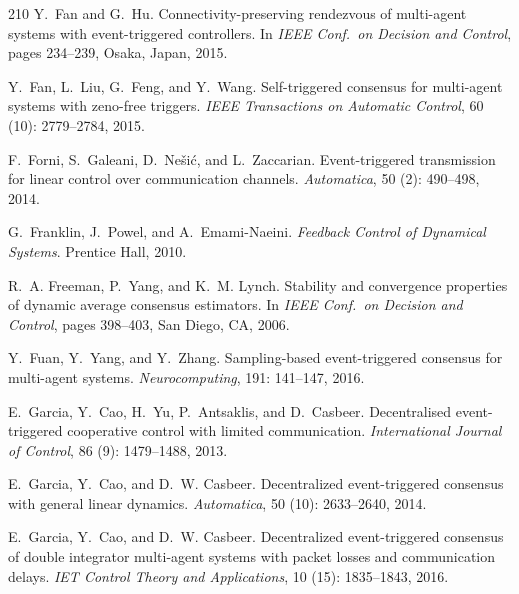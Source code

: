 \documentclass{autart}
\begin{document}
{\begin{thebibliography}{210}
Y.~Fan and G.~Hu.
\newblock Connectivity-preserving rendezvous of multi-agent systems with
  event-triggered controllers.
\newblock In \emph{{IEEE} Conf.\ on Decision and Control}, pages 234--239,
  Osaka, Japan, 2015.

Y.~Fan, L.~Liu, G.~Feng, and Y.~Wang.
\newblock Self-triggered consensus for multi-agent systems with zeno-free
  triggers.
\newblock \emph{IEEE Transactions on Automatic Control}, 60
  (10): 2779--2784, 2015.

F.~Forni, S.~Galeani, D.~Ne{\v{s}}i{\'c}, and L.~Zaccarian.
\newblock Event-triggered transmission for linear control over communication
  channels.
\newblock \emph{Automatica}, 50 (2): 490--498, 2014.

G.~Franklin, J.~Powel, and A.~Emami-Naeini.
\newblock \emph{Feedback Control of Dynamical Systems}.
\newblock Prentice Hall, 2010.

R.~A. Freeman, P.~Yang, and K.~M. Lynch.
\newblock Stability and convergence properties of dynamic average consensus
  estimators.
\newblock In \emph{{IEEE} Conf.\ on Decision and Control}, pages 398--403, San
  Diego, CA, 2006.

Y.~Fuan, Y.~Yang, and Y.~Zhang.
\newblock Sampling-based event-triggered consensus for multi-agent systems.
\newblock \emph{Neurocomputing}, 191: 141--147, 2016.

E.~Garcia, Y.~Cao, H.~Yu, P.~Antsaklis, and D.~Casbeer.
\newblock Decentralised event-triggered cooperative control with limited
  communication.
\newblock \emph{International Journal of Control}, 86 (9):
  1479--1488, 2013.

E.~Garcia, Y.~Cao, and D.~W. Casbeer.
\newblock Decentralized event-triggered consensus with general linear dynamics.
\newblock \emph{Automatica}, 50 (10): 2633--2640, 2014.

E.~Garcia, Y.~Cao, and D.~W. Casbeer.
\newblock Decentralized event-triggered consensus of double integrator
  multi-agent systems with packet losses and communication delays.
\newblock \emph{IET Control Theory and Applications}, 10
  (15): 1835--1843, 2016.


\end{thebibliography}}
\end{document}

